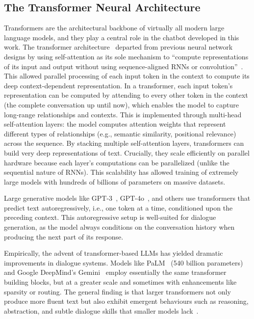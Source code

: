 \subsection*{The Transformer Neural Architecture}
\label{ssec:transformers}
Transformers are the architectural backbone of virtually all modern large language models, and they play a central role in the chatbot developed in this work. The transformer architecture~\cite{vaswani2017attention} departed from previous neural network designs by using self-attention as its sole mechanism to ``compute representations of its input and output without using sequence-aligned RNNs or convolution''~\cite{vaswani2017attention}. This allowed parallel processing of each input token in the context to compute its deep context-dependent representation. In a transformer, each input token's representation can be computed by attending to every other token in the context (the complete conversation up until now), which enables the model to capture long-range relationships and contexts. This is implemented through multi-head self-attention layers: the model computes attention weights that represent different types of relationships (e.g., semantic similarity, positional relevance) across the sequence. By stacking multiple self-attention layers, transformers can build very deep representations of text. Crucially, they scale efficiently on parallel hardware because each layer's computations can be parallelized (unlike the sequential nature of RNNs). This scalability has allowed training of extremely large models with hundreds of billions of parameters on massive datasets.


Large generative models like GPT-3~\cite{brown2020language}, GPT-4o~\cite{openai2023gpt4}, and others use transformers that predict text autoregressively, i.e., one token at a time, conditioned upon the preceding context. This autoregressive setup is well-suited for dialogue generation, as the model always conditions on the conversation history when producing the next part of its response.


Empirically, the advent of transformer-based LLMs has yielded dramatic improvements in dialogue systems. Models like PaLM~\cite{chowdhery2022palm} (540 billion parameters) and Google DeepMind's Gemini~\cite{comanici2025gemini25pushingfrontier} employ essentially the same transformer building blocks, but at a greater scale and sometimes with enhancements like sparsity or routing. The general finding is that larger transformers not only produce more fluent text but also exhibit emergent behaviours such as reasoning, abstraction, and subtle dialogue skills that smaller models lack~\cite{52065,berti2025emergentabilitieslargelanguage}.


